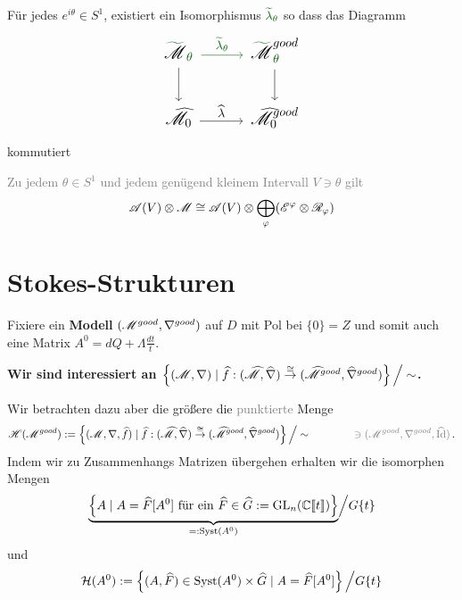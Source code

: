 \begin{paracol}{2} %
  \begin{thm}
    Für jedes $e^{i\theta}\in S^1$, existiert ein Isomorphismus
    $\textcolor{green!40!black}{\tilde\lambda_\theta}$ so dass das Diagramm
    \[ \Large\begin{tikzcd}
        \textcolor{green!40!black}{\tilde{\textcolor{black}{\sM}}_\theta}
        \dar \rar[green!40!black]{\tilde\lambda_\theta}&
        \textcolor{green!40!black}{%
        \tilde{\textcolor{black}{\sM}}_\theta^{\textcolor{black}{good}}}\dar
        \\\hat\sM_0 \rar{\hat\lambda} &
        \hat\sM_0^{good}
    \end{tikzcd} \]
    kommutiert
  \end{thm}
\switchcolumn %
\begin{thm}
  \textcolor{gray}{%
    Zu jedem $\theta\in S^1$ und jedem genügend kleinem Intervall $V\ni\theta$
    gilt
    \[
      \mathscr{A}(V)\otimes\mathscr{M}\cong\mathscr{A}(V)\otimes\bigoplus_\varphi(\mathscr{E}^\varphi\otimes\mathscr{R}_\varphi)
    \]
  }
\end{thm}
\end{paracol} %
\section{Stokes-Strukturen} %
Fixiere ein \textbf{Modell} $(\mathscr{M}^{good},\nabla^{good})$ auf $D$ mit Pol bei
$\{0\}=Z$ und somit auch eine Matrix $A^0=dQ+\Lambda\frac{dt}{t}$.

\begin{center}
  \textbf{Wir sind interessiert an
    $\left\{(\mathscr{M},\nabla)
        \mid \widehat f:(\widehat{\mathscr{M}},\widehat\nabla)
          \overset{\cong}\to
          (\widehat{\mathscr{M}}^{good},\widehat\nabla^{good})
      \right\}\Big/\sim$.}
\end{center}
Wir betrachten dazu aber die größere die \textcolor{gray}{punktierte} Menge
\[
  \sH(\sM^{good}):=\left\{(\sM,\nabla,\hat f)
      \mid \hat f:(\hat\sM,\hat\nabla)
        \overset{\cong}\to
        (\hat\sM^{good},\hat\nabla^{good})
    \right\}\Big/\sim
    \qquad \qquad
    \textcolor{gray}{\ni (\sM^{good},\nabla^{good},\hat \Id)}\,.
\]
Indem wir zu Zusammenhangs Matrizen übergehen erhalten wir die isomorphen
Mengen
\[
  \underset{=:\Syst(A^0)}{\underbrace{%
      \left\{A \mid A=\hat F[A^0]\text{~für ein~}\hat F\in\hat G
      :=\GL_n(\C\llbracket t\rrbracket)\right\}
  }}\Big/G\{t\}
\]
und
\[
  \mathcal{H}(A^0):=\left\{
      (A,\widehat F)\in\operatorname{Syst}(A^0)\times\widehat G\mid A=\widehat F[A^0]
    \right\}\Big/G\{t\}
\]

